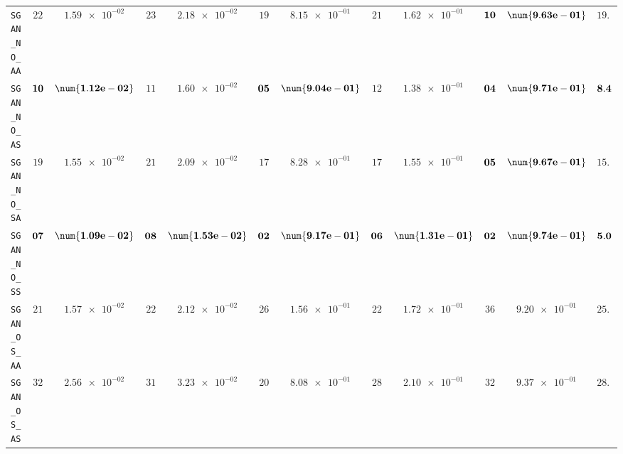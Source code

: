 \begin{xltabular}{\textwidth}{l||cC|cC|cC|cC|cC||c}
	\texttt{SGAN\_NO\_AA} & $ 22$ & $ \num{1.59e-02}$ & $ 23$ & $ \num{2.18e-02}$ & $ 19$ & $ \num{8.15e-01}$ & $ 21$ & $ \num{1.62e-01}$ & $\bf 10$ & $\bf \num{9.63e-01}$ & $ 19.0$  \\
	\texttt{SGAN\_NO\_AS} & $\bf 10$ & $\bf \num{1.12e-02}$ & $ 11$ & $ \num{1.60e-02}$ & $\bf 05$ & $\bf \num{9.04e-01}$ & $ 12$ & $ \num{1.38e-01}$ & $\bf 04$ & $\bf \num{9.71e-01}$ & $\bf 8.4$  \\
	\texttt{SGAN\_NO\_SA} & $ 19$ & $ \num{1.55e-02}$ & $ 21$ & $ \num{2.09e-02}$ & $ 17$ & $ \num{8.28e-01}$ & $ 17$ & $ \num{1.55e-01}$ & $\bf 05$ & $\bf \num{9.67e-01}$ & $ 15.8$  \\
	\texttt{SGAN\_NO\_SS} & $\bf 07$ & $\bf \num{1.09e-02}$ & $\bf 08$ & $\bf \num{1.53e-02}$ & $\bf 02$ & $\bf \num{9.17e-01}$ & $\bf 06$ & $\bf \num{1.31e-01}$ & $\bf 02$ & $\bf \num{9.74e-01}$ & $\bf 5.0$  \\
	\texttt{SGAN\_OS\_AA} & $ 21$ & $ \num{1.57e-02}$ & $ 22$ & $ \num{2.12e-02}$ & $ 26$ & $ \num{1.56e-01}$ & $ 22$ & $ \num{1.72e-01}$ & $ 36$ & $ \num{9.20e-01}$ & $ 25.4$  \\
	\texttt{SGAN\_OS\_AS} & $ 32$ & $ \num{2.56e-02}$ & $ 31$ & $ \num{3.23e-02}$ & $ 20$ & $ \num{8.08e-01}$ & $ 28$ & $ \num{2.10e-01}$ & $ 32$ & $ \num{9.37e-01}$ & $ 28.6$  \\

\end{xltabular}
